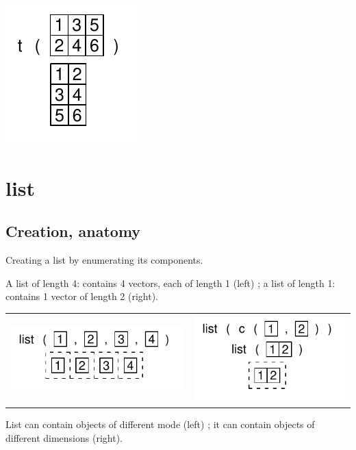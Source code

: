 \documentclass[pdflatex]{article}
\begin{document}
\includegraphics{t.pdf} 

\section{list}

\subsection{Creation, anatomy}

Creating a list by enumerating its components.

A list of length 4: contains 4 vectors, each of length 1 (left) ;
a list of length 1: contains 1 vector of length 2 (right).

\begin{tabular}{cc}
\includegraphics{list_enumerate.pdf} & \includegraphics{list_onetype.pdf}
\end{tabular}

% 

List can contain objects of different mode (left) ;
it can contain objects of different dimensions (right).
\end{document}

